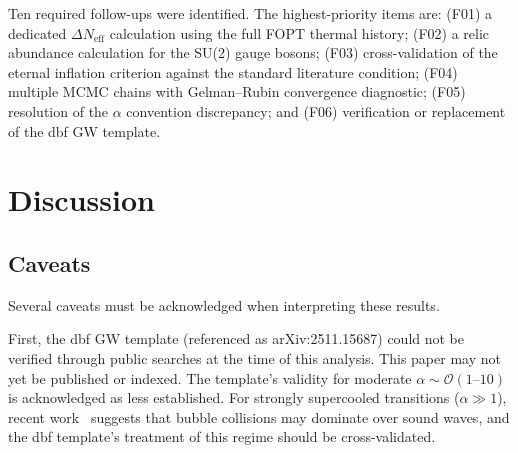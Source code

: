 \documentclass[12pt,a4paper]{article}
\begin{document}
\begin{table}[h]
\centering
{}
\caption{Most critical unresolved assumptions and limitations.}
\label{tab:critical_assumptions}
\end{table}

Ten required follow-ups were identified. The highest-priority items are: (F01) a dedicated $\Delta N_{\text{eff}}$ calculation using the full FOPT thermal history; (F02) a relic abundance calculation for the SU(2) gauge bosons; (F03) cross-validation of the eternal inflation criterion against the standard literature condition; (F04) multiple MCMC chains with Gelman--Rubin convergence diagnostic; (F05) resolution of the $\alpha$ convention discrepancy; and (F06) verification or replacement of the dbf GW template.

\section{Discussion}
\label{sec:discussion}

\subsection{Caveats}

Several caveats must be acknowledged when interpreting these results.

First, the dbf GW template (referenced as arXiv:2511.15687) could not be verified through public searches at the time of this analysis. This paper may not yet be published or indexed. The template's validity for moderate $\alpha \sim \mathcal{O}(1\text{--}10)$ is acknowledged as less established. For strongly supercooled transitions ($\alpha \gg 1$), recent work~\cite{Caprini:2024a, Caprini:2024b} suggests that bubble collisions may dominate over sound waves, and the dbf template's treatment of this regime should be cross-validated.
\end{document}
